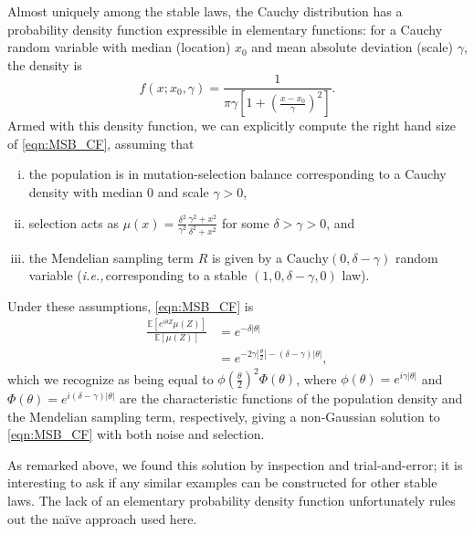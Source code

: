 \documentclass{article}
\newcommand{\ie}{\textit{i.e.,}\,}
\newcommand{\1}{\mathbbm{1}}
\theoremstyle{remark}
\theoremstyle{definition}
\begin{document}
Almost uniquely among the stable laws, the Cauchy distribution has a probability density function expressible in elementary functions: 
for a Cauchy random variable with median (location) $x_{0}$ and mean absolute deviation (scale) $\gamma$, the density is 
\begin{equation}\label{eq:Cpdf}
	f(x;x_{0},\gamma) = \frac{1}{\pi\gamma\left[1+\left(\frac{x-x_{0}}{\gamma}\right)^{2}\right]}.  
\end{equation}	
Armed with this density function, we can explicitly compute the right hand size of \eqref{eqn:MSB_CF}, assuming that 
\begin{enumerate}[(i)]
\item the population is in mutation-selection balance corresponding to a Cauchy density with median 0 and scale $\gamma > 0$,
\item selection acts as $\mu(x) = \frac{\delta^{2}}{\gamma^{2}} \frac{\gamma^{2} + x^{2}}{\delta^{2} + x^{2}}$ for some $\delta > \gamma > 0$, and
\item the Mendelian sampling term $R$ is given by a $\text{Cauchy}(0,\delta-\gamma)$ random variable (\ie corresponding to a stable $(1,0,\delta-\gamma,0)$ law).
\end{enumerate}

Under these assumptions, \eqref{eqn:MSB_CF} is
\begin{align*}
	\frac{\mathbb{E}\left[e^{i \theta Z}\mu(Z)\right]}{\mathbb{E}[\mu(Z)]} 
	&= e^{-\delta |\theta|}\\
	&= e^{-2\gamma \left|\frac{\theta}{2}\right|-(\delta-\gamma)|\theta|},
\end{align*} 
which we recognize as being equal to $\phi\left(\frac{\theta}{2}\right)^{2} \Phi(\theta)$, where $\phi(\theta) = e^{i\gamma|\theta|}$ and $\Phi(\theta) = e^{i(\delta - \gamma)|\theta|}$ are the characteristic functions of the population density and the Mendelian sampling term, respectively,
giving a non-Gaussian solution to \eqref{eqn:MSB_CF} with both noise and selection.

As remarked above, we found this solution by inspection and trial-and-error; it is interesting to ask if any similar examples can be constructed for other stable laws.  The lack of an elementary probability density function unfortunately rules out the na\"ive approach used here. 

\end{document}
